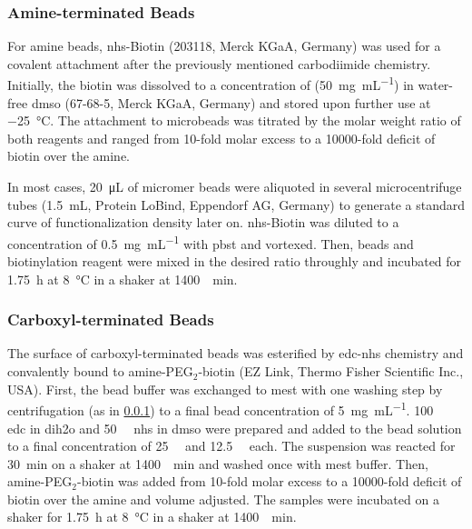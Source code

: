 \subsubsection{Amine-terminated Beads} \label{sec:meth:aminebeads}
For \gls{amine} beads, \gls{nhs}-Biotin (203118, Merck KGaA, Germany) was used for a covalent attachment after the previously mentioned carbodiimide chemistry. Initially, the biotin was dissolved to a concentration of (\SI{50}{\milli\gram\per\milli\liter}) in water-free \gls{dmso} (67-68-5, Merck KGaA, Germany) and stored upon further use at \SI{-25}{\degreeCelsius}. The attachment to microbeads was titrated by the molar weight ratio of both reagents and ranged from 10-fold molar excess to a \num{10000}-fold deficit of biotin over the amine. 

In most cases, \SI{20}{\micro\liter} of micromer beads were aliquoted in several microcentrifuge tubes (\SI{1.5}{\milli\liter}, Protein LoBind, Eppendorf AG, Germany) to generate a standard curve of functionalization density later on. \gls{nhs}-Biotin was diluted to a concentration of \SI{0.5}{\milli\gram\per\milli\liter} with \gls{pbst} and vortexed. Then, beads and biotinylation reagent were mixed in the desired ratio throughly and incubated for \SI{1.75}{\hour} at \SI{8}{\degreeCelsius} in a shaker at \SI{1400}{\per\minute}.
\subsubsection{Carboxyl-terminated Beads}
The surface of \gls{carboxyl}-terminated beads was esterified by \gls{edc}-\gls{nhs} chemistry and convalently bound to amine-PEG$_\mathrm{2}$-biotin (EZ Link, Thermo Fisher Scientific Inc., USA). First, the bead buffer was exchanged to \gls{mest} with one washing step by centrifugation (as in \ref{sec:meth:aminebeads}) to a final bead concentration of \SI{5}{\milli\gram\per\milli\liter}. \SI{100}{\milli\molar} \gls{edc} in \gls{dih2o} and \SI{50}{\milli\molar} \gls{nhs} in \gls{dmso} were prepared and added to the bead solution to a final concentration of \SI{25}{\milli\molar} and \SI{12.5}{\milli\molar} each. The suspension was reacted for \SI{30}{\minute} on a shaker at \SI{1400}{\per\minute} and washed once with \gls{mest} buffer. Then,  amine-PEG$_\mathrm{2}$-biotin was added from 10-fold molar excess to a \num{10000}-fold deficit of biotin over the amine and volume adjusted. The samples were incubated on a shaker for \SI{1.75}{\hour} at \SI{8}{\degreeCelsius} in a shaker at \SI{1400}{\per\minute}.
